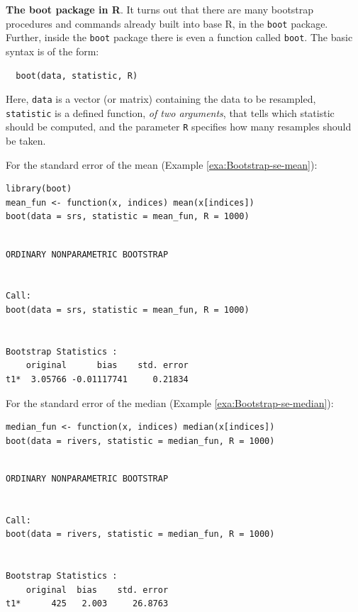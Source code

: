 \documentclass[captions=tableheading]{scrbook}
\begin{document}
\begin{example}
\textbf{The boot package in R}. It turns out that there are many bootstrap procedures and commands already built into base \textsf{R}, in the \texttt{boot} package. Further, inside the \texttt{boot} package there is even a function called \texttt{boot}. The basic syntax is of the form:

\begin{verbatim}
  boot(data, statistic, R)
\end{verbatim}

\end{example}
 Here, \texttt{data} is a vector (or matrix) containing the data to be resampled, \texttt{statistic} is a defined function, \emph{of two arguments}, that tells which statistic should be computed, and the parameter \texttt{R} specifies how many resamples should be taken.

For the standard error of the mean (Example \ref{exa:Bootstrap-se-mean}):


\begin{verbatim}
library(boot)
mean_fun <- function(x, indices) mean(x[indices])
boot(data = srs, statistic = mean_fun, R = 1000)
\end{verbatim}


\begin{verbatim}
 
ORDINARY NONPARAMETRIC BOOTSTRAP


Call:
boot(data = srs, statistic = mean_fun, R = 1000)


Bootstrap Statistics :
    original      bias    std. error
t1*  3.05766 -0.01117741     0.21834
\end{verbatim}

For the standard error of the median (Example \ref{exa:Bootstrap-se-median}):


\begin{verbatim}
median_fun <- function(x, indices) median(x[indices])
boot(data = rivers, statistic = median_fun, R = 1000)
\end{verbatim}


\begin{verbatim}

ORDINARY NONPARAMETRIC BOOTSTRAP


Call:
boot(data = rivers, statistic = median_fun, R = 1000)


Bootstrap Statistics :
    original  bias    std. error
t1*      425   2.003     26.8763
\end{verbatim}
\end{document}
